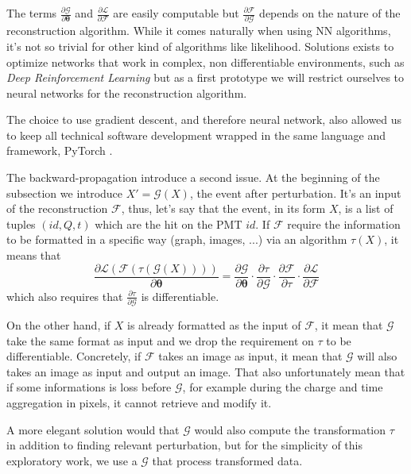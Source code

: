 \documentclass[../main.tex]{subfiles}
\begin{document}
The terms $\frac{\partial \mathcal{G}}{\partial \bm{\theta}}$ and $\frac{\partial \mathcal{L}}{\partial \mathcal{F}}$ are easily computable but $\frac{\partial \mathcal{F}}{\partial \mathcal{G}}$ depends on the nature of the reconstruction algorithm. While it comes naturally when using NN algorithms, it's not so trivial for other kind of algorithms like likelihood. Solutions exists to optimize networks that work in complex, non differentiable environments, such as \textit{Deep Reinforcement Learning} \cite{kiran_deep_2021, vinyals_grandmaster_2019} but as a first prototype we will restrict ourselves to neural networks for the reconstruction algorithm.

The choice to use gradient descent, and therefore neural network, also allowed us to keep all technical software development wrapped in the same language and framework, PyTorch \cite{ansel_pytorch_2024}.

The backward-propagation introduce a second issue. At the beginning of the subsection we introduce $X' = \mathcal{G}(X)$, the event after perturbation. It's an input of the reconstruction $\mathcal{F}$, thus, let's say that the event, in its form $X$, is a list of tuples $(id, Q, t)$ which are the hit on the PMT $id$. If $\mathcal{F}$ require the information to be formatted in a specific way (graph, images, ...) via an algorithm $\tau(X)$, it means that
\begin{equation}
  \frac{\partial \mathcal{L}(\mathcal{F}(\tau(\mathcal{G}(X))))}{\partial \bm{\theta}} = \frac{\partial \mathcal{G}}{\partial \bm{\theta}} \cdot \frac{\partial \tau}{\partial \mathcal{G}} \cdot \frac{\partial \mathcal{F}}{\partial \tau} \cdot \frac{\partial \mathcal{L}}{\partial \mathcal{F}}
\end{equation}
which also requires that $\frac{\partial \tau}{\partial \mathcal{G}}$ is differentiable.

On the other hand, if $X$ is already formatted as the input of $\mathcal{F}$, it mean that $\mathcal{G}$ take the same format as input and we drop the requirement on $\tau$ to be differentiable. Concretely, if $\mathcal{F}$ takes an image as input, it mean that $\mathcal{G}$ will also takes an image as input and output an image. That also unfortunately mean that if some informations is loss before $\mathcal{G}$, for example during the charge and time aggregation in pixels, it cannot retrieve and modify it.

A more elegant solution would that $\mathcal{G}$ would also compute the transformation $\tau$ in addition to finding relevant perturbation, but for the simplicity of this exploratory work, we use a $\mathcal{G}$ that process transformed data.
\end{document}

